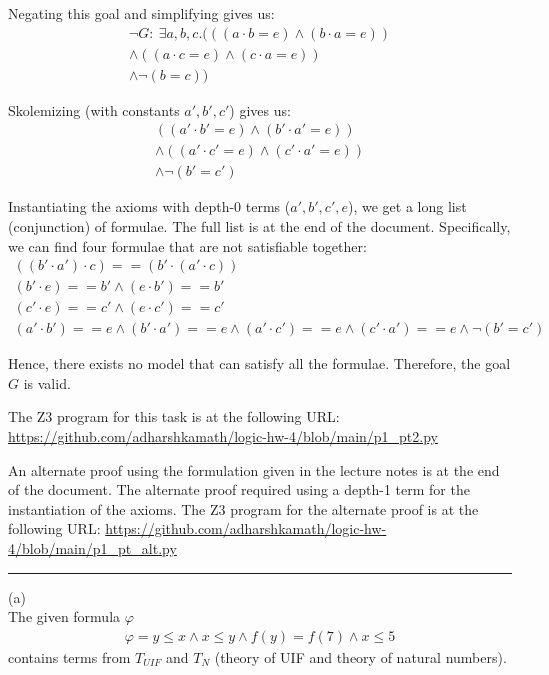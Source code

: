 \documentclass[12pt,letterpaper, onecolumn]{exam}
\newcommand{\link}[1]{{\color{blue}\href{#1}{#1}}}
\begin{document}
\begin{questions}
	Negating this goal and simplifying gives us:
	\begin{align*}
		\neg G : \: \exists a, b, c . (((a \cdot b = e) \land (b \cdot a = e))  \\ \land (
			(a \cdot c = e) \land (c \cdot a = e))  \\ \land \neg(b = c)) 
	\end{align*}

	Skolemizing (with constants $a', b', c'$) gives us:
	\begin{align*}
		((a' \cdot b' = e) \land (b' \cdot a' = e))  \\ \land (
			(a' \cdot c' = e) \land (c' \cdot a' = e))  \\ \land \neg(b' = c')
	\end{align*}

	Instantiating the axioms with depth-0 terms ($a', b', c', e$), we get a long list (conjunction) of formulae. The full list is at the end of the document.
	Specifically, we can find four formulae that are not satisfiable together:
	\begin{align*}
		((b' \cdot a') \cdot c) == (b' \cdot (a' \cdot c))  \\
		(b' \cdot e) == b' \land (e \cdot b') == b' \\
		(c' \cdot e) == c' \land (e \cdot c') == c' \\
		(a' \cdot b') == e \land (b' \cdot a') == e \land (a' \cdot c') == e \land (c' \cdot a') == e \land \neg(b' = c')
	\end{align*}

	Hence, there exists no model that can satisfy all the formulae.
	Therefore, the goal $G$ is valid.

	The Z3 program for this task is at the following URL: 
	\link{https://github.com/adharshkamath/logic-hw-4/blob/main/p1\_pt2.py}

	An alternate proof using the formulation given in the lecture notes is at the end of the document.
	The alternate proof required using a depth-1 term for the instantiation of the axioms.
	The Z3 program for the alternate proof is at the following URL: \link{https://github.com/adharshkamath/logic-hw-4/blob/main/p1\_pt\_alt.py}

    {\rule{17cm}{0.4pt}}

	\question[]
	\solutiontitle

	(a) \\
	The given formula $ \varphi $
	\begin{align*}
		\varphi = y \le x \land x \le y \land f(y) = f(7) \land x \le 5
	\end{align*}
	contains terms from $ T_{UIF} $ and $ T_{N} $ (theory of UIF and theory of natural numbers).


\end{questions}
\end{document}
